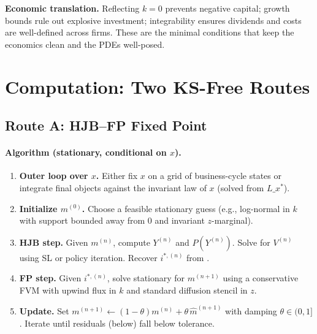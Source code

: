 \documentclass[11pt,letterpaper,oneside]{article}
\numberwithin{equation}{section}
\newcommand{\ac}[1]{{\mdseries\textsc{#1}}}
\newcommand{\1}{\mathbf{1}}
\newcommand{\Lx}{L\_x}
\begin{document}
\begin{tcolorbox}[didacticstyle]
\textbf{Economic translation.} Reflecting $k=0$ prevents negative capital; growth bounds rule out explosive investment; integrability ensures dividends and costs are well-defined across firms. These are the minimal conditions that keep the economics clean and the PDEs well-posed.
\end{tcolorbox}

\section{Computation: Two KS-Free Routes}

\subsection{Route A: \ac{HJB}--\ac{FP} Fixed Point}\label{sec:routeA}

\paragraph{Algorithm (stationary, conditional on $x$).}
\begin{enumerate}[leftmargin=1.5em,label=\textbf{A.\arabic*}]
\item \textbf{Outer loop over $x$.} Either fix $x$ on a grid of business-cycle states or integrate final objects against the invariant law of $x$ (solved from $\Lx^\ast$).
\item \textbf{Initialize $m^{(0)}$.} Choose a feasible stationary guess (e.g., log-normal in $k$ with support bounded away from $0$ and invariant $z$-marginal).
\item \textbf{HJB step.} Given $m^{(n)}$, compute $Y^{(n)}$ and $P(Y^{(n)})$. Solve  for $V^{(n)}$ using \ac{SL} or policy iteration. Recover $i^{*,(n)}$ from .
\item \textbf{FP step.} Given $i^{*,(n)}$, solve stationary  for $m^{(n+1)}$ using a conservative \ac{FVM} with upwind flux in $k$ and standard diffusion stencil in $z$.
\item \textbf{Update.} Set $m^{(n+1)}\leftarrow (1-\theta)m^{(n)}+\theta\,\widehat m^{(n+1)}$ with damping $\theta\in(0,1]$. Iterate until residuals (below) fall below tolerance.
\end{enumerate}
\end{document}
